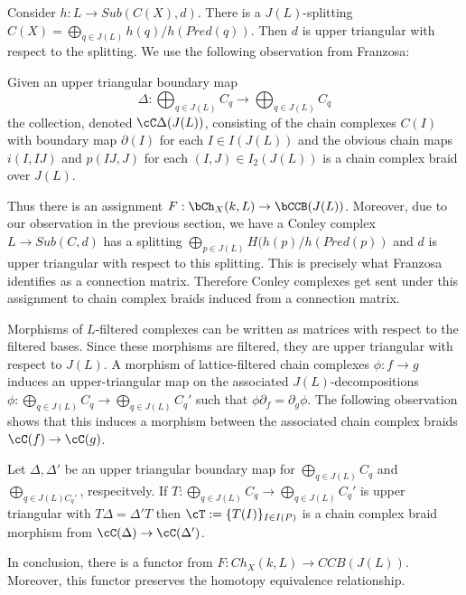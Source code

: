 Consider $h:L\to Sub(C(X),d)$.  There is a $J(L)$-splitting $C(X)=\bigoplus_{q\in J(L)} h(q)/h(Pred(q))$. Then $d$ is upper triangular with respect to the splitting.  We use the following observation from Franzosa:


\begin{prop}
Given an upper triangular boundary map $$\Delta:\bigoplus_{q\in J(L)} C_q\to \bigoplus_{q\in J(L)} C_q$$ the collection, denoted $\cC\Delta(J(L))$, consisting of the chain complexes $C(I)$ with boundary map $\partial(I)$ for each $I\in I(J(L))$ and the obvious chain maps $i(I,IJ)$ and $p(IJ,J)$ for each $(I,J)\in I_2(J(L))$ is a chain complex braid over $J(L)$.
\end{prop}


Thus there is an assignment $F:\bCh_X(k,L)\to \bCCB(J(L))$.   Moreover, due to our observation in the previous section, we have a Conley complex $L\to Sub(C,d)$ has a splitting $\bigoplus_{p\in J(L)} H(h(p)/h(Pred(p))$ and $d$ is upper triangular with respect to this splitting.  This is precisely what Franzosa identifies as a connection matrix.  Therefore Conley complexes get sent under this assignment to chain complex braids induced from a connection matrix.



Morphisms of $L$-filtered complexes can be written as matrices with respect to the filtered bases.   Since these morphisms are filtered, they are upper triangular with respect to $J(L)$.  A morphism of lattice-filtered chain complexes $\phi:f\to g$ induces an upper-triangular map on the associated $J(L)$-decompositions $\phi:\bigoplus_{q\in J(L)}C_q\to \bigoplus_{q\in J(L)} C_q'$ such that $\phi\partial_f = \partial_g\phi$.  The following observation shows that this induces a morphism between the associated chain complex braids $\cC(f)\to \cC(g)$.

\begin{prop}
Let $\Delta,\Delta'$ be an upper triangular boundary map for $\bigoplus_{q\in J(L)} C_q$ and $\bigoplus_{q\in J(L) C_q'}$, respecitvely.  If $T:\bigoplus_{q\in J(L)} C_q\to \bigoplus_{q\in J(L)} C_q'$ is upper triangular with $T\Delta = \Delta'T$ then $\cT:=\{T(I)\}_{I\in I(P)}$ is a chain complex braid morphism from $\cC(\Delta)\to \cC(\Delta')$.
\end{prop}

In conclusion, there is a functor from $F:Ch_X(k,L)\to CCB(J(L))$.  Moreover, this functor preserves the homotopy equivalence relationship.

